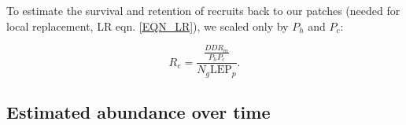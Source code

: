 \documentclass[12pt, oneside]{article}   	%
\begin{document}
To estimate the survival and retention of recruits back to our patches (needed for local replacement, LR eqn. \ref{EQN_LR}), we scaled only by $P_h$ and $P_c$: 

\begin{equation}
R_e = \frac{\frac{DD R_m}{P_h P_c}}{N_g \text{LEP}_p}. \label{EQN_Re}
\end{equation}




\subsection*{Estimated abundance over time} %
\end{document}
